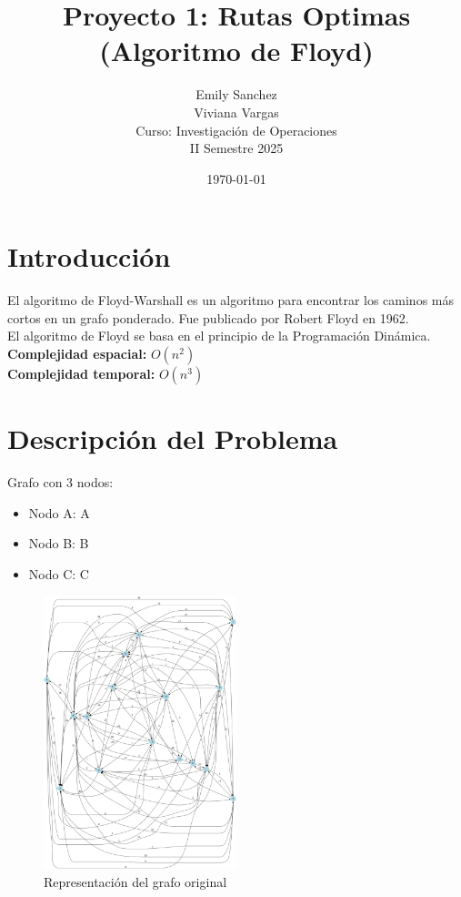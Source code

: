 \documentclass[12pt]{article}
\title{Proyecto 1: Rutas Optimas (Algoritmo de Floyd)}
\author{Emily Sanchez \\ Viviana Vargas \\[1cm] Curso: Investigación de Operaciones \\ II Semestre 2025}
\date{\today}
\begin{document}
\maketitle
\thispagestyle{empty}
\newpage
\setcounter{page}{1}

\section{Introducción}
El algoritmo de Floyd-Warshall es un algoritmo para encontrar los caminos más cortos en un grafo ponderado. Fue publicado por Robert Floyd en 1962.\\
El algoritmo de Floyd se basa en el principio de la Programación Dinámica.\\
\textbf{Complejidad espacial:} $O(n^2)$\\
\textbf{Complejidad temporal:} $O(n^3)$\\
\clearpage
\section{Descripción del Problema}
Grafo con 3 nodos:

\begin{itemize}
\item Nodo A: A
\item Nodo B: B
\item Nodo C: C
\end{itemize}

\begin{figure}[h!]
\centering
\includegraphics[width=0.5\textwidth,keepaspectratio]{grafo.png}
\caption{Representación del grafo original}
\end{figure}
\end{document}
